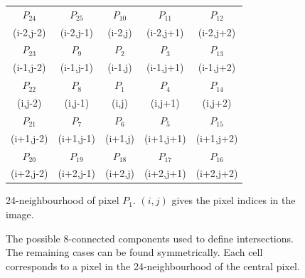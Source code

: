 \begin{figure}[H]
\centering
\begin{tabular}{|c|c|c|c|c|}
\hline
$P_{24}$ & $P_{25}$ & $P_{10}$ & $P_{11}$ & $P_{12}$ \\
(i-2,j-2) & (i-2,j-1) & (i-2,j)   & (i-2,j+1) & (i-2,j+2) \\ \hline
$P_{23}$ & $P_{9}$  & $P_{2}$  & $P_{3}$  & $P_{13}$ \\
(i-1,j-2) & (i-1,j-1) & (i-1,j)   & (i-1,j+1) & (i-1,j+2) \\ \hline
$P_{22}$ & $P_{8}$  & $P_{1}$  & $P_{4}$  & $P_{14}$ \\
(i,j-2)   & (i,j-1)   & (i,j)     & (i,j+1)   & (i,j+2)  \\ \hline
$P_{21}$ & $P_{7}$  & $P_{6}$  & $P_{5}$  & $P_{15}$ \\
(i+1,j-2) & (i+1,j-1) & (i+1,j)   & (i+1,j+1) & (i+1,j+2) \\ \hline
$P_{20}$ & $P_{19}$ & $P_{18}$ & $P_{17}$ & $P_{16}$ \\
(i+2,j-2) & (i+2,j-1) & (i+2,j)   & (i+2,j+1) & (i+2,j+2) \\ \hline
\end{tabular}
\caption{24-neighbourhood of pixel $P_1$. $(i,j)$ gives the pixel indices in the image.}
\label{tab:theory/comb}
\end{figure}


\begin{figure}[H]%
 \centering
 \quad \quad \quad
 \vspace{1.5em}
 \caption{The possible 8-connected components used to define intersections. The remaining cases can be found symmetrically. Each cell corresponds to a pixel in the 24-neighbourhood of the central pixel.}%
 \label{fig:theory/conncomp}
\end{figure}

